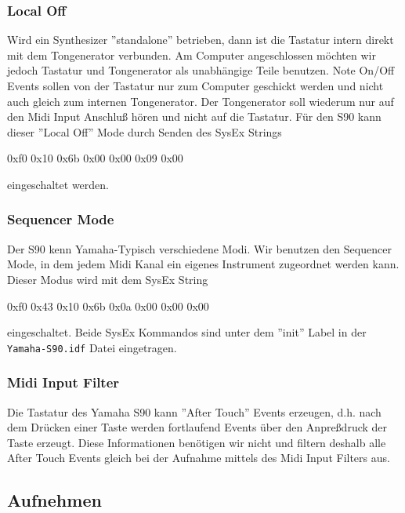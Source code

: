      \subsubsection{Local Off}
      Wird ein Synthesizer ''standalone'' betrieben, dann ist die Tastatur
      intern direkt mit dem Tongenerator verbunden. Am Computer angeschlossen
      möchten wir jedoch Tastatur und Tongenerator als unabhängige Teile
      benutzen. Note On/Off Events sollen von der Tastatur nur zum Computer
      geschickt werden und nicht auch gleich zum internen Tongenerator.
      Der Tongenerator soll wiederum nur auf den Midi Input Anschluß hören
      und nicht auf die Tastatur. Für den S90 kann dieser ''Local Off''
      Mode durch Senden des SysEx Strings

      \starttyping
            0xf0 0x10 0x6b 0x00 0x00 0x09 0x00
      \stoptyping

      eingeschaltet werden.

      \subsubsection{Sequencer Mode}
      Der S90 kenn Yamaha-Typisch verschiedene Modi. Wir benutzen den
      Sequencer Mode, in dem jedem Midi Kanal ein eigenes Instrument
      zugeordnet werden kann. Dieser Modus wird mit dem SysEx String

      \starttyping
            0xf0 0x43 0x10 0x6b 0x0a 0x00 0x00 0x00
      \stoptyping

      eingeschaltet. Beide SysEx Kommandos sind unter dem ''init'' Label in
      der {\tt Yamaha-S90.idf} Datei eingetragen.

      \subsubsection{Midi Input Filter}
      Die Tastatur des Yamaha S90 kann ''After Touch'' Events erzeugen, d.h.
      nach dem Drücken einer Taste werden fortlaufend Events über den
      Anpreßdruck der Taste erzeugt. Diese Informationen benötigen wir
      nicht und filtern deshalb alle After Touch Events gleich bei der
      Aufnahme mittels des Midi Input Filters aus.


      \subsection{Aufnehmen}
